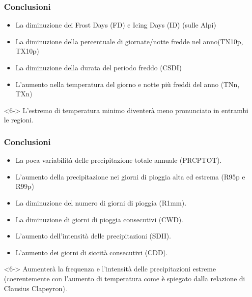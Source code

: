 \begin{frame}[t]
\end{frame} 

\begin{frame}	
    \frametitle{Conclusioni}
    \begin{itemize}	
    \item<1-> La diminuzione dei Frost Days (FD) e Icing Days (ID) (sulle Alpi)
	\item<2-> La diminuzione della percentuale di giornate/notte fredde nel anno(TN10p, TX10p) 
	\item<3-> La diminuzione della durata del periodo freddo (CSDI)
	\item<4-> L'aumento nella temperatura del giorno e notte più freddi del anno (TNn, TXn)
	\end{itemize}

\begin{alertblock}<6->{}
L'estremo di temperatura minimo diventerà meno pronunciato in entrambi le regioni. 
\end{alertblock}	
\end{frame}	

		
\begin{frame}	
    \frametitle{Conclusioni}
    \begin{itemize}	
    \item<1-> La poca variabilità delle precipitazione totale annuale (PRCPTOT).
    \item<2-> L'aumento della precipitazione nei giorni di pioggia alta ed estrema (R95p e R99p)
	\item<2-> La diminuzione del numero di giorni di pioggia (R1mm).  %
	\item<3-> La diminuzione di giorni di pioggia consecutivi (CWD).
	\item<4-> L'aumento dell'intensità delle precipitazioni (SDII). 
	\item<5-> L'aumento dei giorni di siccità consecutivi (CDD).
	\end{itemize}

\begin{alertblock}<6->{}
       \setlength\itemsep{0pt}
	  Aumenterà la frequenza e l'intensità delle precipitazioni estreme (coerentemente con l'aumento di temperatura come è spiegato dalla relazione di Clausius Clapeyron).
\end{alertblock}	
\end{frame}	
	
